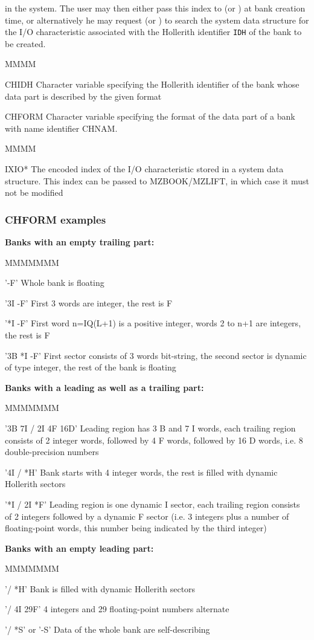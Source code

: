 in the system.
The user may then either pass this index to  (or )
at bank creation time,
or alternatively he may request  (or ) to search
the system data structure for the I/O characteristic
associated with the Hollerith identifier {\tt IDH} of the bank to be
created.
\Idesc
\begin{DL}{MMMM}
\item[CHIDH]Character variable specifying the Hollerith identifier of the
bank whose data part is described by the given format
\item[CHFORM]Character variable specifying the format of the data
part of a bank with name identifier CHNAM.
\end{DL}
\Odesc
\begin{DL}{MMMM}
\item[IXIO*]The encoded index of the I/O characteristic stored in a system
data structure.
This index can be passed to MZBOOK/MZLIFT, in which case it must
not be modified
\end{DL}
\subsubsection{CHFORM examples}
{\bf Banks with an empty trailing part:}
\begin{DL}{MMMMMMM}
\item['-F']Whole bank is floating
\item['3I -F']First 3 words are integer, the rest is F
\item['*I -F']First word n=IQ(L+1) is a positive integer,
words 2 to n+1 are integers, the rest is F
\item['3B *I -F']First sector consists of 3 words bit-string,
the second sector is dynamic of type integer,
the rest of the bank is floating
\end{DL}
{\bf Banks with a leading as well as a trailing part:}
\begin{DL}{MMMMMMM}
\item['3B 7I / 2I 4F 16D']Leading region has 3 B and 7 I words,
each trailing region consists of
2 integer words, followed by 4 F words,
followed by 16 D words, i.e. 8 double-precision numbers
\item['4I / *H']Bank starts with 4 integer words,
the rest is filled with dynamic Hollerith sectors
\item['*I / 2I *F']Leading region is one dynamic I sector,
each trailing region consists of 2 integers
followed by a dynamic F sector
(i.e. 3 integers plus a number of floating-point words,
this number being indicated by the third integer)
\end{DL}
{\bf Banks with an empty leading part:}
\begin{DL}{MMMMMMM}
\item['/ *H']Bank is filled with dynamic Hollerith sectors
\item['/ 4I 29F']4 integers and 29 floating-point numbers alternate
\item['/ *S' or '-S']Data of the whole bank are self-describing
\end{DL}
 
